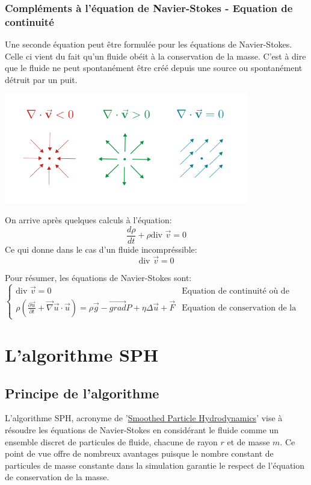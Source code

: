 \documentclass[a4paper,10pt]{report}
\begin{document}
\subsubsection{Compléments à l'équation de Navier-Stokes - Equation de continuité}
Une seconde équation peut être formulée pour les équations de Navier-Stokes. Celle ci vient du fait qu'un fluide obéit à la conservation de la masse. C'est à dire que le fluide ne peut spontanément être créé depuis une source ou spontanément détruit par un puit.
\begin{center}
 \includegraphics[width=0.8\textwidth]{equation_de_continuite_navier-stokes}
\end{center}
On arrive après quelques calculs à l'équation:
$$ \frac{d \rho}{dt} + \rho \text{div } \vec{v} = 0$$
Ce qui donne dans le cas d'un fluide incompréssible:
$$ \boxed{\text{div } \vec{v} = 0} $$

\vfill
Pour résumer, les équations de Navier-Stokes sont:
$$
\boxed{\begin{cases}
 \text{div } \vec{v} = 0 & \text{Equation de continuité où de conservation de la masse} \\
 \rho (\frac{\partial \vec{u}}{\partial t} + \vec{\nabla}\vec{u}\cdot \vec{u} ) = \rho \vec{g} - \vec{grad} P + \eta \Delta \vec{u} + \vec{F} & \text{Equation de conservation de la quantité de mouvement}
\end{cases}}
$$
\vfill
\newpage

\section{L'algorithme SPH}

\subsection{Principe de l'algorithme}
L'algorithme SPH, acronyme de '\href{https://en.wikipedia.org/wiki/Smoothed-particle_hydrodynamics}{Smoothed Particle Hydrodynamics}' vise à résoudre les équations de Navier-Stokes en considérant le fluide comme un ensemble discret de particules de fluide, chacune de rayon $r$ et de masse $m$. Ce point de vue offre de nombreux avantages puisque le nombre constant de particules de masse constante dans la simulation garantie le respect de l'équation de conservation de la masse.
\end{document}
